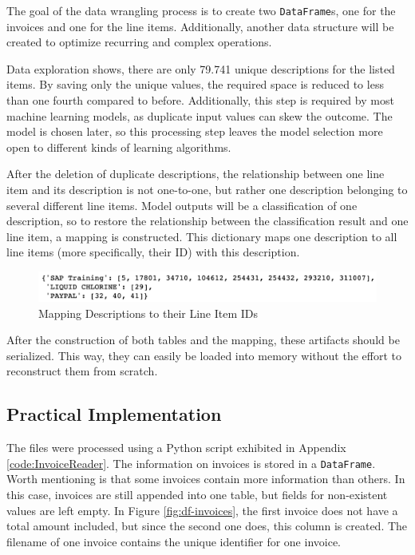 	The goal of the data wrangling process is to create two \lstinline|DataFrame|s, one for the invoices and one for the line items.
	Additionally, another data structure will be created to optimize recurring and complex operations.
	
	Data exploration shows, there are only 79.741 unique descriptions for the listed items. By saving only the unique values, the required space is reduced to less than one fourth compared to before. Additionally, this step is required by most machine learning models, as duplicate input values can skew the outcome. The model is chosen later, so this processing step leaves the model selection more open to different kinds of learning algorithms.
	
	After the deletion of duplicate descriptions, the relationship between one line item and its description is not one-to-one, but rather one description belonging to several different line items. Model outputs will be a classification of one description, so to restore the relationship between the classification result and one line item, a mapping is constructed.
	This dictionary maps one description to all line items (more specifically, their ID) with this description.
	\begin{figure}[ht]
		\centering
		\includegraphics[width=\linewidth]{Bilder/description_map.png}
		\caption{Mapping Descriptions to their Line Item IDs}
		\label{fig:mapping}
	\end{figure}


	After the construction of both tables and the mapping, these artifacts should be serialized. This way, they can easily be loaded into memory without the effort to reconstruct them from scratch.
	
    \subsection{Practical Implementation}
	
	The files were processed using a Python script exhibited in Appendix \ref{code:InvoiceReader}. The information on invoices is stored in a  \lstinline|DataFrame|. Worth mentioning is that some invoices contain more information than others. In this case, invoices are still appended into one table, but fields for non-existent values are left empty. In Figure \ref{fig:df-invoices}, the first invoice does not have a total amount included, but since the second one does, this column is created.
	The filename of one invoice contains the unique identifier for one invoice.
	
